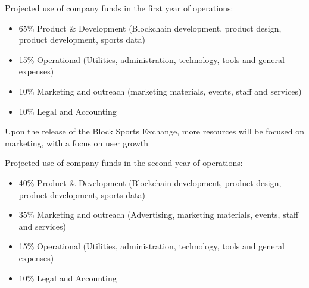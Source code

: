 \documentclass{article}
\begin{document}
Projected use of company funds in the first year of operations:

\begin{itemize}
	\item  65\% Product \& Development (Blockchain development, product design, product development, sports data)
	\item 15\% Operational (Utilities, administration, technology, tools and general expenses)
	\item 10\% Marketing and outreach (marketing materials, events, staff and services)
	\item 10\% Legal and Accounting
\end{itemize}

Upon the release of the Block Sports Exchange, more resources will be focused on marketing, with a focus on user growth

Projected use of company funds in the second year of operations:

\begin{itemize}
	\item 40\% Product \& Development (Blockchain development, product design, product development, sports data)
	\item 35\% Marketing and outreach (Advertising, marketing materials, events, staff and services)
	\item 15\% Operational (Utilities, administration, technology, tools and general expenses)
	\item 10\% Legal and Accounting
\end{itemize}
\end{document}
